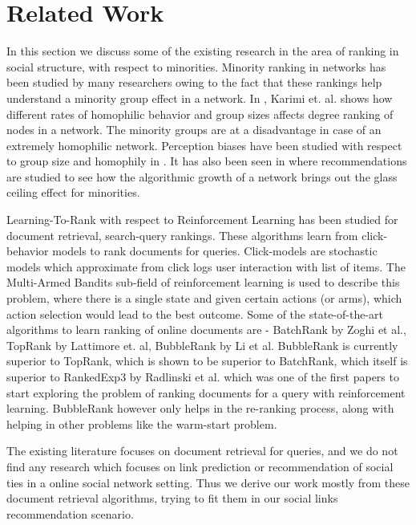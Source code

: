 \section{Related Work}

In this section we discuss some of the existing research in the area of ranking in social structure, with respect to minorities. Minority ranking in networks has been studied by many researchers owing to the fact that these rankings help understand a minority group effect in a network. In \cite{karimi2018homophily}, Karimi et. al. shows how different rates of homophilic behavior and group sizes affects degree ranking of nodes in a network. The minority groups are at a disadvantage in case of an extremely homophilic network. Perception biases have been studied with respect to group size and homophily in \cite{lee2017homophily}. It has also been seen in \cite{stoica2018algorithmic} where recommendations are studied to see how the algorithmic growth of a network brings out the glass ceiling effect for minorities. 

Learning-To-Rank with respect to Reinforcement Learning has been studied for document retrieval, search-query rankings. These algorithms learn from click-behavior models to rank documents for queries. Click-models are stochastic models which approximate from click logs user interaction with list of items. The Multi-Armed Bandits sub-field of reinforcement learning is used to describe this problem, where there is a single state and given certain actions (or arms), which action selection would lead to the best outcome. Some of the state-of-the-art algorithms to learn ranking of online documents are - BatchRank \cite{zoghi2017online} by Zoghi et al., TopRank \cite{lattimore2018toprank} by Lattimore et. al, BubbleRank \cite{li2019bubblerank} by Li et al. BubbleRank is currently superior to TopRank, which is shown to be superior to BatchRank, which itself is superior to RankedExp3 \cite{radlinski2008learning} by Radlinski et al. which was one of the first papers to start exploring the problem of ranking documents for a query with reinforcement learning. BubbleRank however only helps in the re-ranking process, along with helping in other problems like the warm-start problem. 

The existing literature focuses on document retrieval for queries, and we do not find any research which focuses on link prediction or recommendation of social ties in a online social network setting. Thus we derive our work mostly from these document retrieval algorithms, trying to fit them in our social links recommendation scenario. 